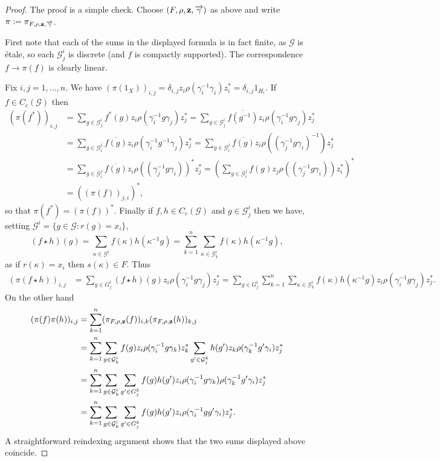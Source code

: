 \documentclass[11 pt, leqno, hidelinks]{amsart}%
\theoremstyle{plain}
\numberwithin{equation}{section}
\newcommand{\GG}{\mathcal{G}}
\begin{document}
\begin{proof}
The proof is a simple check. Choose $(F, \rho, \bf{z}, \overrightarrow{\gamma})$ as above and  write $\pi:=\pi_{F, \rho, \bf{z}, \overrightarrow{\gamma}}$.
	
First note that each of the sums in the displayed formula is in fact finite, as $\GG$ is \'etale, so each $\GG_j^i$ is discrete (and $f$ is compactly supported). The correspondence $f\to \pi(f)$ is clearly linear.

Fix $i,j=1, \ldots, n$. We have  $(\pi(1_X))_{i,j}= \delta_{i,j} z_i \rho(\gamma_i^{-1}\gamma_i) z_i^* = \delta_{i,j} 1_{H_i}$. If $f \in C_c(\GG)$ then
\begin{align*}  (\pi (f^*))_{i,j} &= \sum_{g \in \GG_j^i} f^*(g) z_{i} \rho (\gamma_{i}^{-1}g \gamma_{j}) z_j^*
= \sum_{g \in \GG_j^i} \overline{f(g^{-1})} z_{i} \rho (\gamma_{i}^{-1}g \gamma_{j}) z_j^*
\\& = \sum_{g \in \GG_i^j} \overline{f(g)} z_{i} \rho (\gamma_{i}^{-1}g^{-1} \gamma_{j}) z_j^* =
 \sum_{g \in \GG_i^j} \overline{f(g)} z_{i} \rho ((\gamma_{j}^{-1}g \gamma_{i})^{-1}) z_j^*
\\&=
\sum_{g \in \GG_i^j} \overline{f(g)} z_{i} \rho ((\gamma_{j}^{-1}g \gamma_{i}))^* z_j^*
=
 \left( \sum_{g \in \GG_i^j} f(g) z_{j} \rho ((\gamma_{j}^{-1}g \gamma_{i})) z_i^* \right)^*
\\&= \left((\pi (f))_{j,i}\right)^*, \end{align*}
so that $\pi (f^*) = \left(\pi (f)\right)^*$.
Finally if $f, h\in C_c(\GG)$ and $g \in \GG_j^i$ then we have, setting $\GG^i=\{g \in \GG: r(g) =x_i\}$,
\[ (f\star h)(g) = \sum_{\kappa \in \GG^i} f(\kappa)h(\kappa^{-1}g) = \sum_{k=1}^n
\sum_{\kappa \in \GG_k ^i} f(\kappa)h(\kappa^{-1}g),\]
as if $r(\kappa)= x_i$ then $s(\kappa) \in F$. Thus
\begin{align*} (\pi (f\star h))_{i,j} &= \sum_{g \in G_j^i} (f \star h)(g) z_{i} \rho (\gamma_{i}^{-1}g \gamma_{j}) z_j^*
= \sum_{g \in G_j^i} \sum_{k=1}^n
\sum_{\kappa \in \GG_k^i} f(\kappa)h(\kappa^{-1}g) z_{i} \rho (\gamma_{i}^{-1}g \gamma_{j}) z_j^*.
\end{align*}
On the other hand
\begin{align*} (\pi (f)  \pi (h))_{i,j}
	&= \sum_{k=1}^n 	(\pi_{F, \rho, \bf{z}} (f))_{i,k}  (\pi_{F, \rho, \bf{z}} (h))_{k,j}
	\\&= \sum_{k=1}^n \sum_{g \in \GG_k^i} f(g) z_{i} \rho (\gamma_{i}^{-1}g \gamma_{k}) z_k^*
	\sum_{g'\in \GG_j^k} h(g') z_{k} \rho (\gamma_{k}^{-1}g' \gamma_{i}) z_j^*
	\\&=
\sum_{k=1}^n \sum_{g \in \GG_k^i} 	\sum_{g'\in G_j^k} f(g) h(g')  z_i \rho (\gamma_{i}^{-1}g \gamma_{k}) \rho (\gamma_{k}^{-1}g' \gamma_{i}) z_j^*
\\&=
\sum_{k=1}^n \sum_{g \in \GG_k^i} 	\sum_{g'\in G_j^k} f(g) h(g')  z_i \rho (\gamma_{i}^{-1}g g' \gamma_{i}) z_j^*.
\end{align*}	
A straightforward reindexing argument shows that the two  sums displayed above coincide.
\end{proof}
\end{document}
